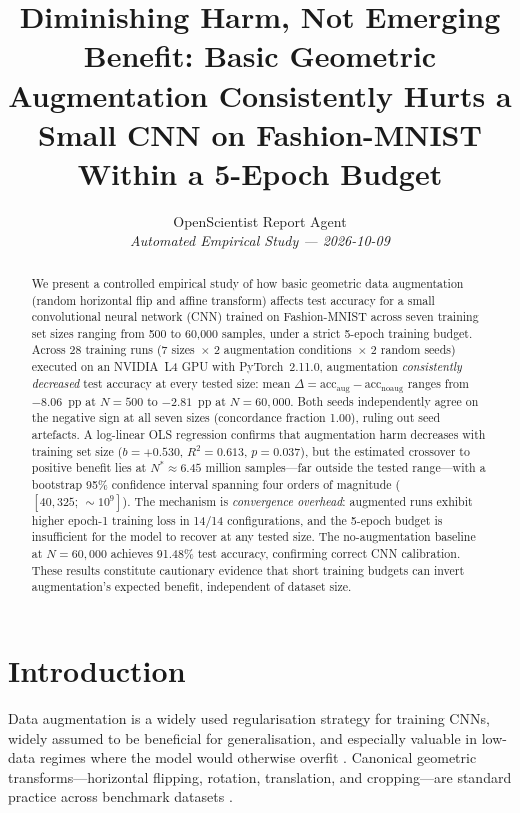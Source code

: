 \documentclass[11pt]{article}
\title{\textbf{Diminishing Harm, Not Emerging Benefit: Basic Geometric Augmentation
Consistently Hurts a Small CNN on Fashion-MNIST
Within a 5-Epoch Budget}}
\author{%
  OpenScientist Report Agent\\[2pt]
  \small\textit{Automated Empirical Study --- 2026-10-09}
}
\date{}
\begin{document}
\maketitle
\thispagestyle{empty}

\begin{abstract}
We present a controlled empirical study of how basic geometric data augmentation
(random horizontal flip and affine transform) affects test accuracy for a small
convolutional neural network (CNN) trained on Fashion-MNIST across seven training
set sizes ranging from 500 to 60,000 samples, under a strict 5-epoch training
budget.
Across 28 training runs (7 sizes~$\times$ 2 augmentation conditions~$\times$
2 random seeds) executed on an NVIDIA~L4 GPU with PyTorch~2.11.0, augmentation
\emph{consistently decreased} test accuracy at every tested size: mean
$\Delta = \text{acc}_\text{aug} - \text{acc}_\text{noaug}$ ranges from
$-8.06$~pp at $N{=}500$ to $-2.81$~pp at $N{=}60{,}000$.
Both seeds independently agree on the negative sign at all seven sizes
(concordance fraction 1.00), ruling out seed artefacts.
A log-linear OLS regression confirms that augmentation harm decreases with
training set size ($b{=}{+}0.530$, $R^2{=}0.613$, $p{=}0.037$), but the
estimated crossover to positive benefit lies at $N^\ast \approx 6.45$ million
samples---far outside the tested range---with a bootstrap 95\% confidence
interval spanning four orders of magnitude ($[40{,}325;\, {\sim}10^9]$).
The mechanism is \emph{convergence overhead}: augmented runs exhibit higher
epoch-1 training loss in 14/14 configurations, and the 5-epoch budget is
insufficient for the model to recover at any tested size.
The no-augmentation baseline at $N{=}60{,}000$ achieves 91.48\% test accuracy,
confirming correct CNN calibration.
These results constitute cautionary evidence that short training budgets can
invert augmentation's expected benefit, independent of dataset size.
\end{abstract}

\section{Introduction}
\label{sec:intro}

Data augmentation is a widely used regularisation strategy for training CNNs,
widely assumed to be beneficial for generalisation, and especially valuable in
low-data regimes where the model would otherwise overfit
\citep{mukhamediev2024state,kumar2025enhancing}.
Canonical geometric transforms---horizontal flipping, rotation, translation,
and cropping---are standard practice across benchmark datasets
\citep{karada2020empirical,poojary2021effect}.
\end{document}

